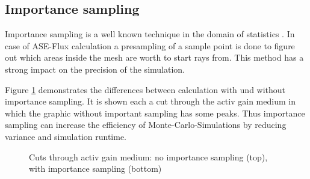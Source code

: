 \subsection{Importance sampling}
Importance sampling is a well known technique in the domain
of statistics \cite{importanceSamplingSource}. In case of 
ASE-Flux calculation a presampling of a sample point is done
to figure out which areas inside the mesh are worth to start rays from.
This method has a strong impact on the precision of the
simulation.

Figure \ref{graphic:importance} demonstrates
the differences between calculation with und without
importance sampling. It is shown each a cut through the activ 
gain medium in which the graphic without important
sampling has some peaks. Thus importance 
sampling can increase the efficiency of Monte-Carlo-Simulations 
by reducing variance and simulation runtime. 
\begin{figure}
  \centerline
  {}
  \caption{Cuts through activ gain medium: no importance sampling (top), with importance sampling (bottom)}
  \label{graphic:importance}
\end{figure}

